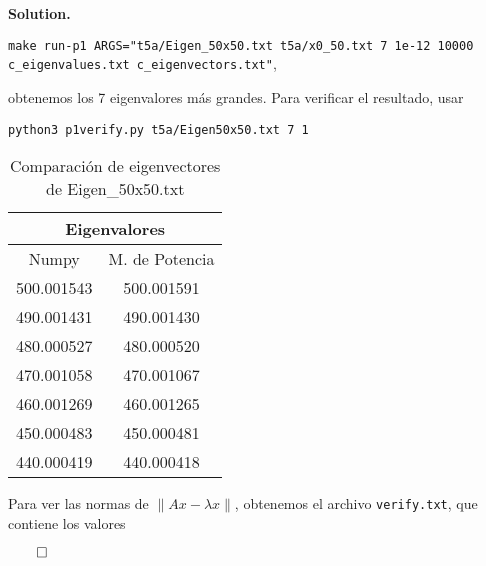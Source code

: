 \documentclass{article}
\theoremstyle{problemstyle}
\newenvironment{solution}{%
  \begin{mdframed}[linewidth=0.8pt,linecolor=Gray,backgroundcolor=Gray!5,roundcorner=5pt]%
  \noindent\textbf{Solution.}%
}{%
\hfill $ \qed $ 
  \end{mdframed}%
}
\begin{document}
\begin{solution}
\begin{enumerate}
\begin{center}
			      \texttt{make run-p1
				      ARGS="t5a/Eigen\_50x50.txt t5a/x0\_50.txt 7 1e-12 10000 c\_eigenvalues.txt
				      c\_eigenvectors.txt"},
		      \end{center}
		      obtenemos los 7 eigenvalores m\'as grandes. Para verificar el resultado, usar
		      \begin{center}
			      \texttt{python3 p1\textunderscore verify.py t5a/Eigen\textunderscore50x50.txt 7 1}
		      \end{center}
		      \begin{table}[H]
			      \begin{center}
				      \begin{tabular}{|c|c|}
					      \multicolumn{2}{c}{Eigenvalores} \\
					      \hline
					      Numpy      & M. de Potencia      \\
					      \hline
					      500.001543 & 500.001591          \\
					      \hline
					      490.001431 & 490.001430          \\
					      \hline
					      480.000527 & 480.000520          \\
					      \hline
					      470.001058 & 470.001067          \\
					      \hline
					      460.001269 & 460.001265          \\
					      \hline
					      450.000483 & 450.000481          \\
					      \hline
					      440.000419 & 440.000418          \\
					      \hline
				      \end{tabular}
			      \end{center}
			      \caption{Comparaci\'on de eigenvectores de Eigen\_50x50.txt}\label{tab:evals50x50}
		      \end{table}


		      Para ver las normas de $ \lVert Ax - \lambda x\rVert $, obtenemos el archivo \texttt{verify.txt}, que contiene los valores


\end{enumerate}
\end{solution}
\end{document}
